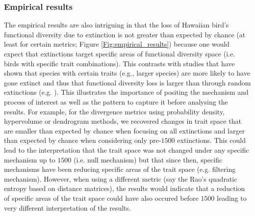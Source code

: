 \documentclass[12pt,letterpaper]{article}
\begin{document}
\subsubsection{Empirical results}

The empirical results are also intriguing in that the loss of Hawaiian bird's functional diversity due to extinction is not greater than expected by chance (at least for certain metrics; Figure \ref{Fig:empirical_results}) because one would expect that extinctions target specific areas of functional diversity space (i.e. birds with specific trait combinations).
This contrasts with studies that have shown that species with certain traits (e.g., larger species) are more likely to have gone extinct and thus that functional diversity loss is larger than through random extinctions (e.g. \citealt{sayol2021loss,Matthews2022}).
This illustrates the importance of positing the mechanism and process of interest as well as the pattern to capture it before analysing the results.
For example, for the divergence metrics using probability density, hypervolume or dendrogram methods, we recovered changes in trait space that are smaller than expected by chance when focusing on all extinctions and larger than expected by chance when considering only pre-$1500$ extinctions.
This could lead to the interpretation that the trait space was not changed under any specific mechanism up to $1500$ (i.e. null mechanism) but that since then, specific mechanisms have been reducing specific areas of the trait space (e.g. filtering mechanism).
However, when using a different metric (say the Rao's quadratic entropy based on distance matrices), the results would indicate that a reduction of specific areas of the trait space could have also occured before $1500$ leading to very different interpretation of the results.
\end{document}

